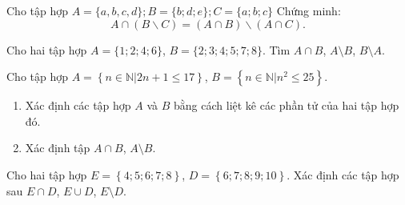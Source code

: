 \begin{bt}%
Cho tập hợp $A=\{a, b, c, d\} ; B=\{b ; d ; e\} ; C=\{a ; b ; c\}$ Chứng minh: $$A \cap(B \backslash C)=(A \cap B) \backslash(A \cap C).$$
\end{bt}

\begin{bt}%
Cho hai tập hợp $A=\{1;2;4;6\}$, $B=\{2;3;4;5;7;8\}$. Tìm $A\cap B$, $A\setminus B$, $B\setminus A$.
\end{bt}

\begin{bt}%
	Cho tập hợp $A= \left\{ n \in \mathbb{N}\big| 2n+1 \le 17\right\}$, $B=\left\{ n\in \mathbb{N} \big| n^2 \le 25\right\}$.
	\begin{enumerate}
		\item Xác định các tập hợp $A$ và $B$ bằng cách liệt kê các phần tử của hai tập hợp đó.
		\item Xác định tập $A \cap B$, $A \setminus B$.
	\end{enumerate}
\end{bt}

\begin{bt}%
	Cho hai tập hợp $E=\left\{4;5;6;7;8\right\}$, $D=\left\{6;7;8;9;10\right\}$. Xác định các tập hợp sau $E\cap D$, $E\cup D$, $E\setminus D$.
\end{bt}

